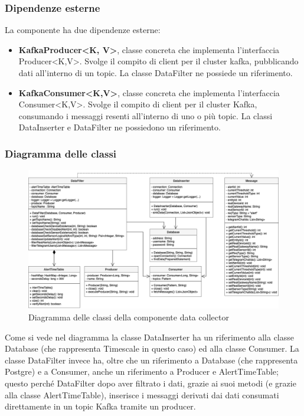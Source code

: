 		\subsubsection{Dipendenze esterne}
			La componente ha due dipendenze esterne:
			\begin{itemize}
				\item \textbf{KafkaProducer<K, V>}, classe concreta che implementa l'interfaccia Producer<K,V>. Svolge il compito di client per il cluster kafka, pubblicando dati all'interno di un topic. La classe DataFilter ne possiede un riferimento.
				\item \textbf{KafkaConsumer<K,V>}, classe concreta che implementa l'interfaccia Consumer<K,V>. Svolge il compito di client per il cluster Kafka, consumando i messaggi resenti all'interno di uno o più topic. La classi DataInserter e DataFilter ne possiedono un riferimento.	
			\end{itemize}	
		\begin{landscape}
		\subsubsection{Diagramma delle classi}%
			\begin{figure}[H]
				\centering
				\includegraphics[scale=0.550]{res/images/DATACOLLECTOR/ClassikafkaDataCollector.png}
				\caption{Diagramma delle classi della componente data collector}
				\label{Diagramma 6}
			\end{figure}
		Come si vede nel diagramma la classe DataInserter ha un riferimento alla classe Database (che rappresenta Timescale in questo caso) ed alla classe Consumer. La classe DataFilter invece ha, oltre che un riferimento a Database (che rappresenta Postgre) e a Consumer, anche un riferimento a Producer e AlertTimeTable; questo perché DataFilter dopo aver filtrato i dati, grazie ai suoi metodi (e grazie alla classe AlertTimeTable), inserisce i messaggi derivati dai dati consumati direttamente in un topic Kafka tramite un producer.  
		\end{landscape}
